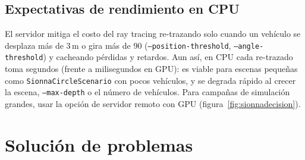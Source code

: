 \documentclass[11pt,a4paper]{article}
\begin{document}
\subsection{Expectativas de rendimiento en CPU}

El servidor mitiga el costo del ray tracing re-trazando solo cuando un
veh\'iculo se desplaza m\'as de 3\,m o gira m\'as de 90\textdegree{}
(\texttt{--position-threshold}, \texttt{--angle-threshold}) y cacheando
p\'erdidas y retardos. Aun as\'i, en CPU cada re-trazado toma segundos (frente
a milisegundos en GPU): es viable para escenas peque\~nas como
\texttt{SionnaCircleScenario} con pocos veh\'iculos, y se degrada r\'apido al
crecer la escena, \texttt{--max-depth} o el n\'umero de veh\'iculos. Para
campa\~nas de simulaci\'on grandes, usar la opci\'on de servidor remoto con
GPU (figura~\ref{fig:sionnadecision}).

\clearpage

\section{Soluci\'on de problemas}
\label{sec:trouble}
\end{document}
